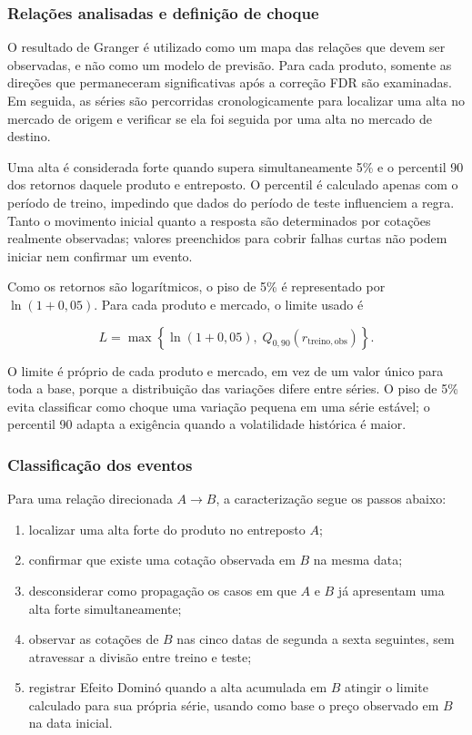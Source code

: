 \documentclass[12pt,a4paper]{article}
\begin{document}
\subsubsection{Relações analisadas e definição de choque}

O resultado de Granger é utilizado como um mapa das relações que devem ser
observadas, e não como um modelo de previsão. Para cada produto, somente as
direções que permaneceram significativas após a correção FDR são examinadas.
Em seguida, as séries são percorridas cronologicamente para localizar uma
alta no mercado de origem e verificar se ela foi seguida por uma alta no
mercado de destino.

Uma alta é considerada forte quando supera simultaneamente 5\% e o
percentil 90 dos retornos daquele produto e entreposto. O percentil é
calculado apenas com o período de treino, impedindo que dados do período de
teste influenciem a regra. Tanto o movimento inicial quanto a resposta são
determinados por cotações realmente observadas; valores preenchidos para
cobrir falhas curtas não podem iniciar nem confirmar um evento.

Como os retornos são logarítmicos, o piso de 5\% é representado por
$\ln(1+0{,}05)$. Para cada produto e mercado, o limite usado é

\begin{equation}
    L = \max\left\{\ln(1+0{,}05),\;Q_{0{,}90}(r_{\mathrm{treino,obs}})\right\}.
\end{equation}

O limite é próprio de cada produto e mercado, em vez de um valor único para
toda a base, porque a distribuição das variações difere entre séries. O piso de
5\% evita classificar como choque uma variação pequena em uma série estável; o
percentil 90 adapta a exigência quando a volatilidade histórica é maior.

\subsubsection{Classificação dos eventos}

Para uma relação direcionada $A \rightarrow B$, a caracterização segue os
passos abaixo:

\begin{enumerate}
    \setlength{\itemsep}{0.2em}
    \item localizar uma alta forte do produto no entreposto $A$;
    \item confirmar que existe uma cotação observada em $B$ na mesma data;
    \item desconsiderar como propagação os casos em que $A$ e $B$ já apresentam
    uma alta forte simultaneamente;
    \item observar as cotações de $B$ nas cinco datas de segunda a sexta seguintes, sem
    atravessar a divisão entre treino e teste;
    \item registrar Efeito Dominó quando a alta acumulada em $B$ atingir o
    limite calculado para sua própria série, usando como base o preço observado
    em $B$ na data inicial.
\end{enumerate}
\end{document}
